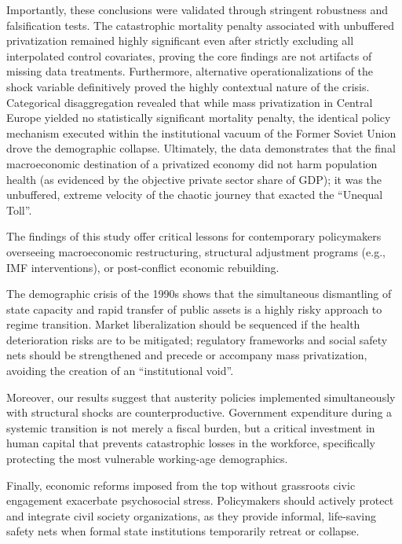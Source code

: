 \documentclass[en,magisterska]{pracamgr}
\begin{document}
Importantly, these conclusions were validated through stringent robustness and falsification tests. The catastrophic mortality penalty associated with unbuffered privatization remained highly significant 
even after strictly excluding all interpolated control covariates, proving the core findings are not artifacts of missing data treatments. Furthermore, alternative operationalizations of the shock variable 
definitively proved the highly contextual nature of the crisis. Categorical disaggregation revealed that while mass privatization in Central Europe yielded no statistically significant mortality penalty, 
the identical policy mechanism executed within the institutional vacuum of the Former Soviet Union drove the demographic collapse. Ultimately, the data demonstrates that the final macroeconomic destination 
of a privatized economy did not harm population health (as evidenced by the objective private sector share of GDP); it was the unbuffered, extreme velocity of the chaotic journey that exacted the ``Unequal Toll''.

The findings of this study offer critical lessons for contemporary policymakers overseeing macroeconomic restructuring, structural adjustment programs (e.g., IMF interventions), or post-conflict economic 
rebuilding. 

The demographic crisis of the 1990s shows that the simultaneous dismantling of state capacity and rapid transfer of public assets is a highly risky approach to regime transition. 
    Market liberalization should be sequenced if the health deterioration risks are to be mitigated; regulatory frameworks and social safety nets should be strengthened and precede or accompany mass privatization, avoiding the creation of an ``institutional void''.

Moreover, our results suggest that austerity policies implemented simultaneously with structural shocks are counterproductive. Government expenditure during a systemic transition is 
    not merely a fiscal burden, but a critical investment in human capital that prevents catastrophic losses in the workforce, specifically protecting the most vulnerable working-age demographics.
    
 Finally, economic reforms imposed from the top  without grassroots civic engagement exacerbate psychosocial stress. Policymakers should actively protect and integrate 
    civil society organizations, as they provide informal, life-saving safety nets when formal state institutions temporarily retreat or collapse.
\end{document}
